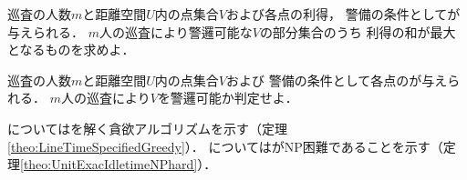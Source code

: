 \begin{timeSpecifiedPatrollingProblem}
  巡査の人数$m$と距離空間$U$内の点集合$V$および各点の利得，
  警備の条件として{\exactIdletime}が与えられる．
  $m$人の巡査により警邏可能な$V$の部分集合のうち
  利得の和が最大となるものを求めよ．
\end{timeSpecifiedPatrollingProblem}

\begin{timeSpecifiedPatrollingProblemDecision}
  巡査の人数$m$と距離空間$U$内の点集合$V$および
  警備の条件として各点の{\exactIdletime}が与えられる．
  $m$人の巡査により$V$を警邏可能か判定せよ．
\end{timeSpecifiedPatrollingProblemDecision}


{\graphLine}については{\timeSpecifiedPatProbDecision}を解く貪欲アルゴリズムを示す（定理\ref{theo:LineTimeSpecifiedGreedy}）．
{\graphUnit}については{\timeSpecifiedPatProb}がNP困難であることを示す（定理\ref{theo:UnitExacIdletimeNPhard}）．
